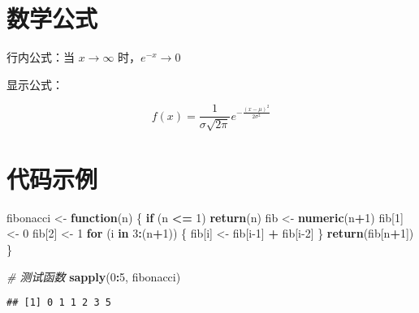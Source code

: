 \documentclass[
]{article}
\newenvironment{Shaded}{\begin{snugshade}}{\end{snugshade}}
\newcommand{\CommentTok}[1]{\textcolor[rgb]{0.56,0.35,0.01}{\textit{#1}}}
\newcommand{\ControlFlowTok}[1]{\textcolor[rgb]{0.13,0.29,0.53}{\textbf{#1}}}
\newcommand{\DecValTok}[1]{\textcolor[rgb]{0.00,0.00,0.81}{#1}}
\newcommand{\FunctionTok}[1]{\textcolor[rgb]{0.13,0.29,0.53}{\textbf{#1}}}
\newcommand{\NormalTok}[1]{#1}
\newcommand{\OtherTok}[1]{\textcolor[rgb]{0.56,0.35,0.01}{#1}}
\newcommand{\SpecialCharTok}[1]{\textcolor[rgb]{0.81,0.36,0.00}{\textbf{#1}}}
\begin{document}
\section{数学公式}\label{ux6570ux5b66ux516cux5f0f}

行内公式：当 \(x \to \infty\) 时，\(e^{-x} \to 0\)

显示公式：

\[
f(x) = \frac{1}{\sigma\sqrt{2\pi}} e^{-\frac{(x-\mu)^2}{2\sigma^2}}
\]

\section{代码示例}\label{ux4ee3ux7801ux793aux4f8b}

\begin{Shaded}
\begin{Highlighting}[]
\NormalTok{fibonacci }\OtherTok{\textless{}{-}} \ControlFlowTok{function}\NormalTok{(n) \{}
  \ControlFlowTok{if}\NormalTok{ (n }\SpecialCharTok{\textless{}=} \DecValTok{1}\NormalTok{) }\FunctionTok{return}\NormalTok{(n)}
\NormalTok{  fib }\OtherTok{\textless{}{-}} \FunctionTok{numeric}\NormalTok{(n}\SpecialCharTok{+}\DecValTok{1}\NormalTok{)}
\NormalTok{  fib[}\DecValTok{1}\NormalTok{] }\OtherTok{\textless{}{-}} \DecValTok{0}
\NormalTok{  fib[}\DecValTok{2}\NormalTok{] }\OtherTok{\textless{}{-}} \DecValTok{1}
  \ControlFlowTok{for}\NormalTok{ (i }\ControlFlowTok{in} \DecValTok{3}\SpecialCharTok{:}\NormalTok{(n}\SpecialCharTok{+}\DecValTok{1}\NormalTok{)) \{}
\NormalTok{    fib[i] }\OtherTok{\textless{}{-}}\NormalTok{ fib[i}\DecValTok{{-}1}\NormalTok{] }\SpecialCharTok{+}\NormalTok{ fib[i}\DecValTok{{-}2}\NormalTok{]}
\NormalTok{  \}}
  \FunctionTok{return}\NormalTok{(fib[n}\SpecialCharTok{+}\DecValTok{1}\NormalTok{])}
\NormalTok{\}}

\CommentTok{\# 测试函数}
\FunctionTok{sapply}\NormalTok{(}\DecValTok{0}\SpecialCharTok{:}\DecValTok{5}\NormalTok{, fibonacci)}
\end{Highlighting}
\end{Shaded}

\begin{verbatim}
## [1] 0 1 1 2 3 5
\end{verbatim}
\end{document}

